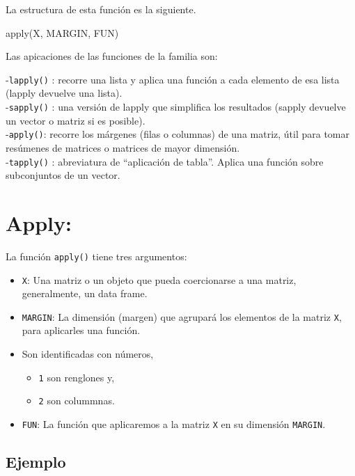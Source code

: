 \documentclass[
]{book}
\newenvironment{Shaded}{\begin{snugshade}}{\end{snugshade}}
\newcommand{\FunctionTok}[1]{\textcolor[rgb]{0.00,0.00,0.00}{#1}}
\newcommand{\NormalTok}[1]{#1}
\providecommand{\tightlist}{%
  \setlength{\itemsep}{0pt}\setlength{\parskip}{0pt}}
\begin{document}
La estructura de esta función es la siguiente.

\begin{Shaded}
\begin{Highlighting}[]
\FunctionTok{apply}\NormalTok{(X, MARGIN, FUN)}
\end{Highlighting}
\end{Shaded}

Las apicaciones de las funciones de la familia son:

-\texttt{lapply()} : recorre una lista y aplica una función a cada elemento de esa lista (lapply devuelve una lista).\\
-\texttt{sapply()} : una versión de lapply que simplifica los resultados (sapply devuelve un vector o matriz si es posible).\\
-\texttt{apply()}: recorre los márgenes (filas o columnas) de una matriz, útil para tomar resúmenes de matrices o matrices de mayor dimensión.\\
-\texttt{tapply()} : abreviatura de ``aplicación de tabla''. Aplica una función sobre subconjuntos de un vector.

\hypertarget{apply}{%
\section{Apply:}\label{apply}}

La función \texttt{apply()} tiene tres argumentos:

\begin{itemize}
\item
  \texttt{X}: Una matriz o un objeto que pueda coercionarse a una matriz, generalmente, un data frame.
\item
  \texttt{MARGIN}: La dimensión (margen) que agrupará los elementos de la matriz \texttt{X}, para aplicarles una función.
\item
  Son identificadas con números,

  \begin{itemize}
  \tightlist
  \item
    \texttt{1} son renglones y,\\
  \item
    \texttt{2} son colummnas.
  \end{itemize}
\item
  \texttt{FUN}: La función que aplicaremos a la matriz \texttt{X} en su dimensión \texttt{MARGIN}.
\end{itemize}

\hypertarget{ejemplo-20}{%
\subsection*{Ejemplo}\label{ejemplo-20}}
\end{document}
